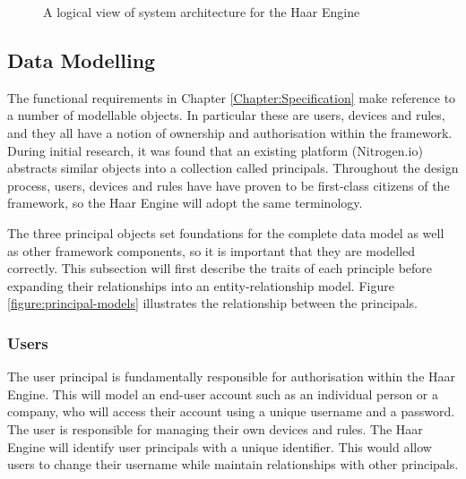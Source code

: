     \begin{figure}
    \centering
    \caption{A logical view of system architecture for the Haar Engine}\label{figure:framework-architecture}
  \end{figure}

    \subsection{Data Modelling}
      The functional requirements in Chapter \ref{Chapter:Specification} make reference to a number of modellable objects. In particular these are users, devices and rules, and they all have a notion of ownership and authorisation within the framework. During initial research, it was found that an existing platform (Nitrogen.io) abstracts similar objects into a collection called principals. Throughout the design process, users, devices and rules have have proven to be first-class citizens of the framework, so the Haar Engine will adopt the same terminology.

      The three principal objects set foundations for the complete data model as well as other framework components, so it is important that they are modelled correctly. This subsection will first describe the traits of each principle before expanding their relationships into an entity-relationship model. Figure \ref{figure:principal-models} illustrates the relationship between the principals.

      \subsubsection{Users}
        The user principal is fundamentally responsible for authorisation within the Haar Engine. This will model an end-user account such as an individual person or a company, who will access their account using a unique username and a password. The user is responsible for managing their own devices and rules. The Haar Engine will identify user principals with a unique identifier. This would allow users to change their username while maintain relationships with other principals.

